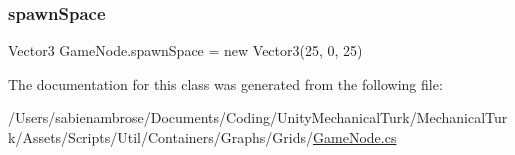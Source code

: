 \mbox{\label{class_game_node_a77a1bb6b3f3feaf660ae439ffd2eb416}} 
\subsubsection{\texorpdfstring{spawn\+Space}{spawnSpace}}
{\footnotesize\ttfamily Vector3 Game\+Node.\+spawn\+Space = new Vector3(25, 0, 25)}



The documentation for this class was generated from the following file\+:\begin{DoxyCompactItemize}
\item 
/\+Users/sabienambrose/\+Documents/\+Coding/\+Unity\+Mechanical\+Turk/\+Mechanical\+Turk/\+Assets/\+Scripts/\+Util/\+Containers/\+Graphs/\+Grids/\mbox{\hyperlink{_game_node_8cs}{Game\+Node.\+cs}}\end{DoxyCompactItemize}
